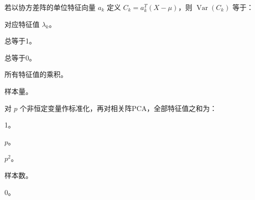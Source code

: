 \par\addvspace{6pt}\noindent\begin{minipage}{\linewidth}


若以协方差阵的单位特征向量 \(a_k\) 定义 \(C_k=a_k^T(X-\mu)\)，则 \(\operatorname{Var}(C_k)\) 等于：


\begin{choices}

\item 对应特征值 \(\lambda_k\)。

\item 总等于1。

\item 总等于0。

\item 所有特征值的乘积。

\item 样本量。

\end{choices}

\end{minipage}\par\vspace{4pt}

\par\addvspace{6pt}\noindent\begin{minipage}{\linewidth}


对 \(p\) 个非恒定变量作标准化，再对相关阵PCA，全部特征值之和为：


\begin{choices}

\item 1。

\item \(p\)。

\item \(p^2\)。

\item 样本数。

\item 0。

\end{choices}

\end{minipage}\par\vspace{4pt}

